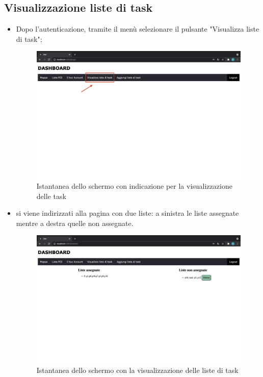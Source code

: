 \subsection{Visualizzazione liste di task}
\begin{itemize}
    \item Dopo l'autenticazione, tramite il menù selezionare il pulsante "Visualizza liste di task";
    \begin{figure}[H]
        \centering
        \includegraphics[scale=0.2]{res/images/dashboard8.png}
        \caption{Istantanea dello schermo con indicazione per la visualizzazione delle task}
    \end{figure}
    \item si viene indirizzati alla pagina con due liste: a sinistra le liste assegnate mentre a destra quelle non assegnate.
    \begin{figure}[H]
        \centering
        \includegraphics[scale=0.2]{res/images/tasklist.png}
        \caption{Istantanea dello schermo con la visualizzazione delle liste di task}

\end{figure}
\end{itemize}
